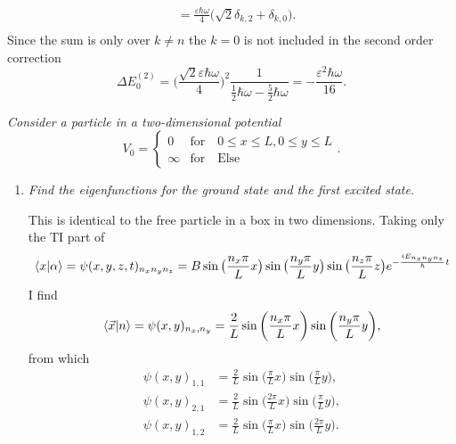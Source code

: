 \begin{example}
\begin{equation}
\begin{split}
			&=\frac{\varepsilon\hbar\omega}{4}\bigg(\sqrt{2}\delta_{k,2}+\delta_{k,0}\bigg).\\
		\end{split}
		\label{shit}
	\end{equation} 
	Since the sum is only over $k\neq n$ the $k=0$ is not included in the second order correction
	\begin{equation}
		\Delta E_0^{(2)}=\bigg(\frac{\sqrt{2}\varepsilon\hbar\omega}{4}\bigg)^2\frac{1}{\frac{1}{2}\hbar\omega-\frac{5}{2}\hbar\omega}=-\frac{\varepsilon^2\hbar\omega}{16}.
	\end{equation} 
\end{example}

\begin{example}
	\emph{Consider a particle in a two-dimensional potential}
	\begin{equation}
		V_0=\begin{cases} 0 &\mbox{for} \quad 0\leq x\leq L, 0\leq y \leq L \\ 
			\infty & \mbox{for} \quad \mbox{Else}  
		\end{cases}. 
	\end{equation} 
	\begin{enumerate}
		\item \emph{Find the eigenfunctions for the ground state and the first excited state.}\newline
		
		This is identical to the free particle in a box in two dimensions. Taking only the TI part of 
		\begin{equation}
			\braket{x|\alpha}=\psi(x,y,z,t)_{n_xn_yn_z}=B\sin\big(\frac{n_x\pi}{L}x\big)\sin\big(\frac{n_y\pi}{L}y\big)\sin\big(\frac{n_z\pi}{L}z\big)e^{-\frac{iE_{n_xn_yn_z}}{\hbar}t}
		\end{equation}
		I find
		\begin{equation}
			\braket{\vec{x}|n}=\psi(x,y)_{n_x,n_y}=\frac{2}{L}\sin\bigg(\frac{n_x\pi}{L}x\bigg)\sin\bigg(\frac{n_y\pi}{L}y\bigg),
		\end{equation} 
		from which
		\begin{equation}
			\begin{split}
				\psi(x,y)_{1,1}&=\frac{2}{L}\sin\bigg(\frac{\pi}{L}x\bigg)\sin\bigg(\frac{\pi}{L}y\bigg),\\
				\psi(x,y)_{2,1}&=\frac{2}{L}\sin\bigg(\frac{2\pi}{L}x\bigg)\sin\bigg(\frac{\pi}{L}y\bigg),\\
				\psi(x,y)_{1,2}&=\frac{2}{L}\sin\bigg(\frac{\pi}{L}x\bigg)\sin\bigg(\frac{2\pi}{L}y\bigg).\\
			\end{split}
			\label{fe}
		\end{equation} 
		

\end{enumerate}
\end{example}
